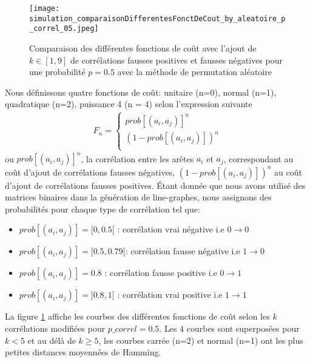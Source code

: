 \label{fonctionDeCout}

\begin{figure}[htb!] 
\centering
\texttt{[image: simulation\_comparaisonDifferentesFonctDeCout\_by\_aleatoire\_p\_correl\_05.jpeg]}
\caption{ Comparaison des diff\'erentes fonctions de co\^ut avec l'ajout de $k \in [1,9]$ de corr\'elations fausses positives et fausses n\'egatives pour une probabilit\'e $p = 0.5$ avec la m\'ethode de permutation al\'eatoire }
\label{compareDifferentesFonctionDeCout_p05} 
\end{figure}

Nous d\'efinissons quatre fonctions de co\^ut: unitaire (n=0), normal (n=1), quadratique (n=2), puissance 4 (n = 4) selon l'expression suivante
\begin{equation}
	\begin{aligned}
	F_n = 
	\begin{cases}
		prob[(a_i,a_j)]^n   \\
		(1 - prob[(a_i,a_j)])^n \\
	\end{cases}
	\end{aligned}
\end{equation}
ou $prob[(a_i,a_j)]^n$, la corr\'elation entre les ar\^etes $a_i$ et $a_j$, correspondant au co\^ut d'ajout de corr\'elations fausses n\'egatives, 
$(1-prob[(a_i,a_j)])^n$ au co\^ut d'ajout de corr\'elations fausses positives.
\newline
\'Etant donn\'ee que nous avons utilis\'e des matrices binaires dans la g\'en\'eration de line-graphes, nous assignons des probabilit\'es pour chaque type de corr\'elation tel que:
\begin{itemize}
\item $prob[(a_i,a_j)] = [0, 0.5[ $ : corr\'elation vrai n\'egative i.e $0 \rightarrow 0$
\item $prob[(a_i,a_j)] = [0.5, 0.79[ $: corr\'elation fausse n\'egative i.e $1 \rightarrow 0$
\item $prob[(a_i,a_j)] = 0.8 $ : corr\'elation fausse positive i.e $0 \rightarrow 1$
\item $prob[(a_i,a_j)] = ]0.8, 1] $ : corr\'elation vrai positive i.e $1 \rightarrow 1$
\end{itemize}
La figure \ref{compareDifferentesFonctionDeCout_p05} affiche les courbes des diff\'erentes fonctions de co\^ut selon les $k$ corr\'elations modifi\'ees pour $p\_correl = 0.5$.
\newline
Les $4$ courbes sont superpos\'ees pour $k<5$ et au d\'el\`a de $k\ge5$, les courbes carr\'ee (n=2) et normal (n=1) ont les plus petites distances moyenn\'ees de Hamming.
